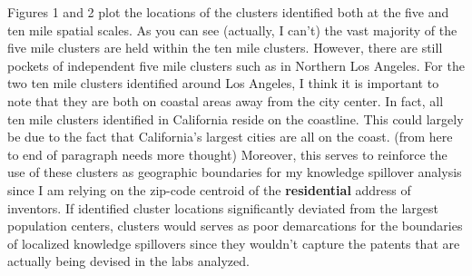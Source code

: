 \documentclass[12pt,letterpaper]{article}
\begin{document}
Figures 1 and 2 plot the locations of the clusters identified both at the five and ten mile spatial scales. As you can see {\color{red}(actually, I can't)} the vast majority of the five mile clusters are held within the ten mile clusters. However, there are still pockets of independent five mile clusters such as in Northern Los Angeles. For the two ten mile clusters identified around Los Angeles, I think it is important to note that they are both on coastal areas away from the city center. In fact, all ten mile clusters identified in California reside on the coastline. This could largely be due to the fact that California's largest cities are all on the coast. {\color{blue}(from here to end of paragraph needs more thought)} Moreover, this serves to reinforce the use of these clusters as geographic boundaries for my knowledge spillover analysis since I am relying on the zip-code centroid of the \textbf{residential} address of inventors. If identified cluster locations significantly deviated from the largest population centers, clusters would serves as poor demarcations for the boundaries of localized knowledge spillovers since they wouldn't capture the patents that are actually being devised in the labs analyzed. 
\end{document}
